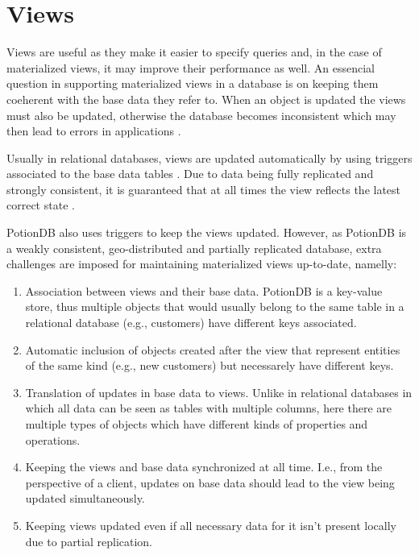 \documentclass{vldb}
\begin{document}

\section{Views}
\label{sec:oldviews}

Views are useful as they make it easier to specify queries and, in the case of materialized views, it may improve their performance as well.
An essencial question in supporting materialized views in a database is on keeping them coeherent with the base data they refer to.
When an object is updated the views must also be updated, otherwise the database becomes inconsistent which may then lead to errors in applications \cite{???}.

Usually in relational databases, views are updated automatically by using triggers associated to the base data tables \cite{???}.
Due to data being fully replicated and strongly consistent, it is guaranteed that at all times the view reflects the latest correct state \cite{???}.

PotionDB also uses triggers to keep the views updated. However, as PotionDB is a weakly consistent, geo-distributed and partially replicated database, extra challenges are imposed for maintaining materialized views up-to-date, namelly:
\begin{enumerate}
	\item Association between views and their base data. 
	PotionDB is a key-value store, thus multiple objects that would usually belong to the same table in a relational database (e.g., customers) have different keys associated.
	\item Automatic inclusion of objects created after the view that represent entities of the same kind (e.g., new customers) but necessarely have different keys.
	\item Translation of updates in base data to views. 
	Unlike in relational databases in which all data can be seen as tables with multiple columns, here there are multiple types of objects which have different kinds of properties and operations.
	\item Keeping the views and base data synchronized at all time.
	I.e., from the perspective of a client, updates on base data should lead to the view being updated simultaneously.
	\item Keeping views updated even if all necessary data for it isn't present locally due to partial replication.
\end{enumerate}
\end{document}
